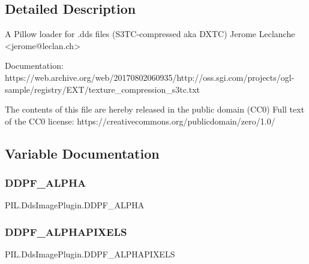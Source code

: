 \subsection{Detailed Description}
\begin{DoxyVerb}A Pillow loader for .dds files (S3TC-compressed aka DXTC)
Jerome Leclanche <jerome@leclan.ch>

Documentation:
  https://web.archive.org/web/20170802060935/http://oss.sgi.com/projects/ogl-sample/registry/EXT/texture_compression_s3tc.txt

The contents of this file are hereby released in the public domain (CC0)
Full text of the CC0 license:
  https://creativecommons.org/publicdomain/zero/1.0/
\end{DoxyVerb}
 

\subsection{Variable Documentation}
\mbox{\label{namespacePIL_1_1DdsImagePlugin_ab5bf78879dfa037321ba8b99e497ad9e}} 
\subsubsection{\texorpdfstring{D\+D\+P\+F\+\_\+\+A\+L\+P\+HA}{DDPF\_ALPHA}}
{\footnotesize\ttfamily P\+I\+L.\+Dds\+Image\+Plugin.\+D\+D\+P\+F\+\_\+\+A\+L\+P\+HA}

\mbox{\label{namespacePIL_1_1DdsImagePlugin_ab0a24eb994422b559f06f4d2c7e0b524}} 
\subsubsection{\texorpdfstring{D\+D\+P\+F\+\_\+\+A\+L\+P\+H\+A\+P\+I\+X\+E\+LS}{DDPF\_ALPHAPIXELS}}
{\footnotesize\ttfamily P\+I\+L.\+Dds\+Image\+Plugin.\+D\+D\+P\+F\+\_\+\+A\+L\+P\+H\+A\+P\+I\+X\+E\+LS}

